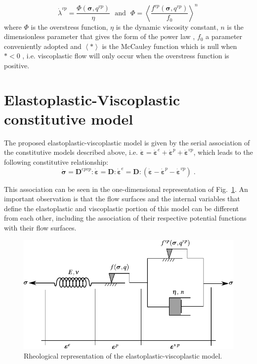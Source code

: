 \documentclass[Journal,letterpaper]{ascelike-new}
\newcommand{\Dsdee}{\boldsymbol{D}}
\newcommand{\Dsdepev}{\boldsymbol{D}^{epvp}}
\newcommand{\dstrain}{\boldsymbol{\dot{\varepsilon}}}
\newcommand{\dstraine}{\boldsymbol{\dot{\varepsilon}}^{e}}
\newcommand{\dstrainp}{\boldsymbol{\dot{\varepsilon}}^{p}}
\newcommand{\dstrainv}{\boldsymbol{\dot{\varepsilon}}^{vp}}
\newcommand{\dstress}{\boldsymbol{\dot{\sigma}}}
\newcommand{\stress}{\boldsymbol{\sigma}}
\begin{document}
\begin{equation} \label{eq_perzyna_model}
	\dot \lambda^{vp} = \dfrac{\Phi(\stress,q^{vp})}{\eta}~~~\text{and}~~~\Phi = \left\langle  \dfrac{f^{vp}(\stress,q^{vp})}{f_0} \right\rangle^n \,
\end{equation} where $\Phi$ is the overstress function, $\eta$ is the dynamic viscosity constant, $n$ is the dimensionless parameter that gives the form of the power law , $f_0$ a parameter conveniently adopted and $\left\langle * \right\rangle$ is the McCauley function which is null when $* <0$ , i.e. viscoplastic flow will only occur when the overstress function is positive.

\section{Elastoplastic-Viscoplastic constitutive model}

The proposed elastoplastic-viscoplastic model is given by the serial association of the constitutive models described above, i.e. $\dstrain = \dstraine + \dstrainp + \dstrainv$, which leads to the following constitutive relationship:
\begin{equation} \label{eq_constitutive_relationship_epvp}
	\dstress = \Dsdepev : \dstrain = \Dsdee : \dstraine = \Dsdee : (\dstrain - \dstrainp - \dstrainv)\;.
\end{equation}

This association can be seen in the one-dimensional representation of Fig.~\ref{reological_scheme}. An important observation is that the flow surfaces and the internal variables that define the elastoplastic and viscoplastic portion of this model can be different from each other, including the association of their respective potential functions with their flow surfaces.

\begin{figure}
	\centering
	\includegraphics[scale=1]{FIG2.pdf}
	\caption{Rheological representation of the elastoplastic-viscoplastic model.}
	\label{reological_scheme}
\end{figure}
\end{document}
